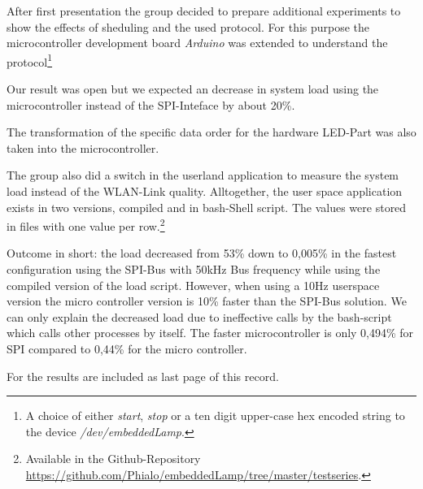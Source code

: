 After first presentation the group decided to prepare additional experiments to show the effects of sheduling and the used protocol.
For this purpose the microcontroller development board \textit{Arduino} was extended to understand the protocol\footnote{A choice of either \textit{start}, \textit{stop} or a ten digit upper-case hex encoded string to the device \textit{/dev/embeddedLamp}.}

Our result was open but we expected an decrease in system load using the microcontroller instead of the SPI-Inteface by about 20\%.

The transformation of the specific data order for the hardware LED-Part was also taken into the microcontroller.

The group also did a switch in the userland application to measure the system load instead of the WLAN-Link quality. Alltogether, the 
user space application exists in two versions, compiled and in bash-Shell script. The values were
stored in files with one value per row.\footnote{Available in the Github-Repository \url{https://github.com/Phialo/embeddedLamp/tree/master/testseries}.}

Outcome in short: the load decreased from 53\% down to 0,005\% in the fastest configuration using the SPI-Bus with 50kHz Bus frequency while using the compiled version of the load script. However, when using a 10Hz userspace version the micro controller version is 10\% faster than the SPI-Bus solution.
We can only explain the decreased load due to ineffective calls by the bash-script which calls other processes by itself. The 
faster microcontroller is only 0,494\% for SPI compared to 0,44\% for the micro controller.

For the results are included as last page of this record.
